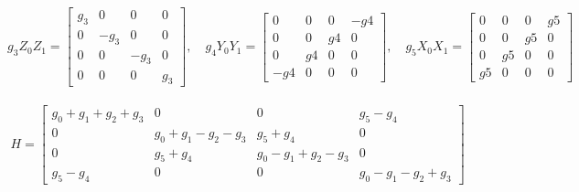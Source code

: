 \documentclass{article}
\begin{document}
\[
g_3 Z_0 Z_1 = \begin{bmatrix}
    g_3 & 0 & 0 & 0\\
    0 & -g_3 & 0 & 0\\
    0 & 0 & -g_3 & 0\\
    0 & 0 & 0 & g_3
    \end{bmatrix}, \quad
g_4 Y_0 Y_1 = \begin{bmatrix}
    0 & 0 & 0 & -g4 \\
    0 & 0 & g4 & 0\\
    0 & g4 & 0 & 0\\
    -g4 & 0 & 0 & 0
    \end{bmatrix}, \quad
g_5 X_0 X_1 = \begin{bmatrix}
    0 & 0 & 0 & g5 \\
    0 & 0 & g5 & 0\\
    0 & g5 & 0 & 0\\
    g5 & 0 & 0 & 0
    \end{bmatrix}
\]
\\
\[
H = \begin{bmatrix}
    g_0 + g_1 + g_2 + g_3 & 0 & 0 & g_5 - g_4\\
    0 & g_0 + g_1 - g_2 - g_3 & g_5 + g_4 & 0\\
    0 & g_5 + g_4 & g_0 - g_1 + g_2 - g_3 & 0\\
    g_5 - g_4 & 0 & 0 & g_0 - g_1 - g_2 +  g_3
    \end{bmatrix}
\]
\end{document}
